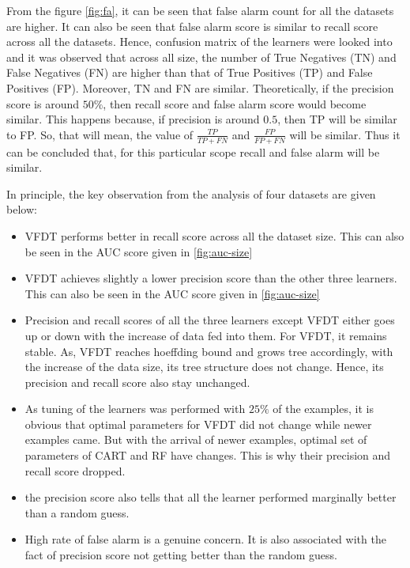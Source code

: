 \documentclass[sigplan]{acmart}\settopmatter{printfolios=true,printccs=false,printacmref=false}
\begin{document}
From the figure \ref{fig:fa}, it can be seen that false alarm count for all the datasets are higher. It can also be seen that false alarm score is similar to recall score across all the datasets. Hence, confusion matrix of the learners were looked into and it was observed that across all size, the number of True Negatives (TN) and False Negatives (FN) are higher than that of True Positives (TP) and False Positives (FP). Moreover, TN and FN are similar. Theoretically, if the precision score is around $50\%$, then recall score and false alarm score would become similar. This happens because, if precision is around $0.5$, then TP will be similar to FP. So, that will mean, the value of $\frac{TP}{TP+FN}$ and $\frac{FP}{FP+FN}$ will be similar. Thus it can be concluded that, for this particular scope recall and false alarm will be similar. 

In principle, the key observation from the analysis of four datasets are given below: 
\begin{itemize}
	\item VFDT performs better in recall score across all the dataset size. This can also be seen in the AUC score given in \ref{fig:auc-size}
	\item VFDT achieves slightly a lower precision score than the other three learners. This can also be seen in the AUC score given in \ref{fig:auc-size}
	\item Precision and recall scores of all the three learners except VFDT either goes up or down with the increase of data fed into them. For VFDT, it remains stable. As, VFDT reaches hoeffding bound and grows tree accordingly, with the increase of the data size, its tree structure does not change. Hence, its precision and recall score also stay unchanged.
	\item As tuning of the learners was performed with $25\%$ of the examples, it is obvious that optimal parameters for VFDT did not change while newer examples came. But with the arrival of newer examples, optimal set of parameters of CART and RF have changes. This is why their precision and recall score dropped.  
	\item the precision score also tells that all the learner performed marginally better than a random guess. 
	\item High rate of false alarm is a genuine concern. It is also associated with the fact of precision score not getting better than the random guess.
\end{itemize}
\end{document}
